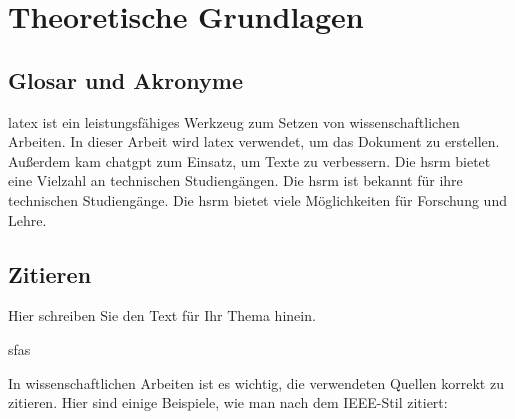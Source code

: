 \chapter{Theoretische Grundlagen}


\section{Glosar und Akronyme}

\gls{latex} ist ein leistungsfähiges Werkzeug zum Setzen von wissenschaftlichen Arbeiten.
In dieser Arbeit wird \gls{latex} verwendet, um das Dokument zu erstellen. Außerdem kam \gls{chatgpt} zum Einsatz, um Texte zu verbessern. Die \acrshort{hsrm} bietet eine Vielzahl an technischen Studiengängen. 
Die \acrshort{hsrm} ist bekannt für ihre technischen Studiengänge. Die \acrfull{hsrm} bietet viele Möglichkeiten für Forschung und Lehre.



\section{Zitieren}

Hier schreiben Sie den Text für Ihr Thema hinein.

sfas \cite{ChatGPTl} \cite{Richard.2020} \cite{Fushimi.Mehrzyklone} \cite{Schlegel.MedPhy.2018}

In wissenschaftlichen Arbeiten ist es wichtig, die verwendeten Quellen korrekt zu zitieren. Hier sind einige Beispiele, wie man nach dem IEEE-Stil zitiert:

